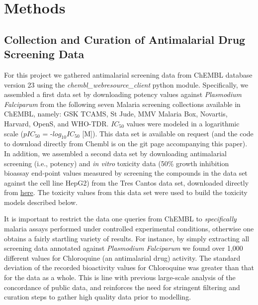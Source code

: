\documentclass{article}
\begin{document}
\section{Methods}

\subsection{Collection and Curation of Antimalarial Drug Screening Data}

For this project we gathered antimalarial screening data from ChEMBL database version 23 using the {\it chembl\_webresource\_client} python module\cite{Davies2015}.
Specifically, we assembled a first data set by downloading potency values against \textit{Plasmodium Falciparum} from the following seven Malaria screening collections available in ChEMBL, namely: GSK TCAMS, St Jude, MMV Malaria Box, Novartis, Harvard, OpenS, and WHO-TDR.
$IC_{50}$ values were modeled in a logarithmic scale ($pIC_{50}$ = -$log_{10} IC_{50}$ [M]). This data set is available on request (and the code to download directly from Chembl is on the git page accompanying this paper).
\newline
\newline
In addition, we assembled a second data set by downloading antimalarial screening (i.e., potency) and {\it in vitro} toxicity data (50\% growth inhibition bioassay end-point values measured by screening the compounds in the data set against the cell line HepG2) from the Tres Cantos data set, downloaded directly from \href{https://chembl.gitbook.io/chembl-ntd/downloads/deposited-set-1-gsk-tcams-dataset-20th-may-2010}{here}. The toxicity values from this data set were used to build the toxicity models described below.
\newline
\newline


It is important to restrict the data one queries from ChEMBL to \textit{specifically} malaria assays performed under controlled experimental conditions, otherwise one obtains a fairly startling variety of results. 
For instance, by simply extracting all screening data annotated against 
\textit{Plasmodium Falciparum} we found over 1,000 different values for Chloroquine (an antimalarial drug) activity. The standard deviation of the recorded bioactivity values for Chloroquine was greater than that for the data as a whole. This is line with previous large-scale analysis of the concordance of public data\cite{Kalliokoski2013,Kalliokoski2013B,Cortes-Ciriano2015}, and reinforces the need for stringent filtering and curation steps to gather high quality data prior to modelling.
\end{document}
